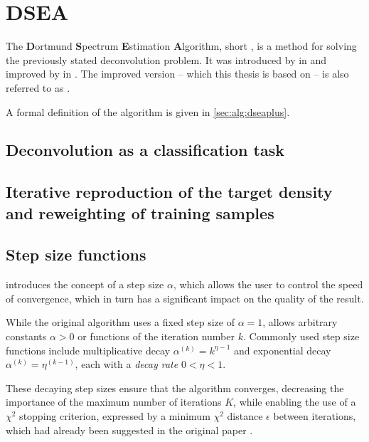 \section{DSEA} %
The \textbf{D}ortmund \textbf{S}pectrum \textbf{E}stimation \textbf{A}lgorithm,
  short \dsea,
is a method for solving the previously stated deconvolution problem.
It was introduced by \citeauthor{dsea_tim} in \citeyear{dsea_tim}
and improved by \citeauthor{dsea_mirko} in \citeyear{dsea_mirko}.
The improved version
  – which this thesis is based on –
is also referred to as \dseaplus.

A formal definition of the \dseaplus algorithm is given in \autoref{sec:alg:dseaplus}.


\subsection{Deconvolution as a classification task} %
\blindtext[2]


\subsection{Iterative reproduction of the target density and reweighting of training samples} %
\blindtext[4]


\subsection{Step size functions} \label{sec:dsea:dsea:stepsize}
\dseaplus introduces the concept of a step size $\alpha$,
which allows the user to control the speed of convergence,
which in turn has a significant impact on the quality of the result.

While the original \dsea algorithm uses a fixed step size of $\alpha = 1$,
\dseaplus allows arbitrary constants $\alpha > 0$
or functions of the iteration number $k$.
Commonly used step size functions include
multiplicative decay
  $\alpha^{(k)} = k^{\eta - 1}$
and exponential decay
  $\alpha^{(k)} = \eta^{(k - 1)}$,
each with a \emph{decay rate} $0 < \eta < 1$.

These decaying step sizes ensure that the algorithm converges,
decreasing the importance of the maximum number of iterations $K$,
while enabling the use of a $\chi^2$ stopping criterion,
  expressed by a minimum $\chi^2$ distance $\epsilon$ between iterations,
  which had already been suggested in the original \dsea paper \cite{dsea_tim}.


